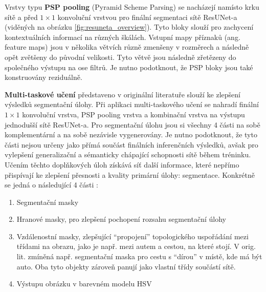 Vrstvy typu \textbf{PSP pooling} (Pyramid Scheme Parsing) se nacházejí namísto krku sítě a před $1\times1$ konvoluční vrstvou pro finální segmentaci sítě ResUNet-a (viděných na obrázku \ref{fig:resuneta_overview}). Tyto bloky slouží pro zachycení kontextuálních informací na různých škálách. Vstupní mapy příznaků (ang. feature maps) jsou v několika větvích různě zmenšeny v rozměrech a následně opět zvětšeny do původní velikosti. Tyto větvě jsou následně zřetězeny do společného výstupu na ose filtrů. Je nutno podotknout, že PSP bloky jsou také konstruovány reziduálně.

\textbf{Multi-taskové učení} představeno v originální literatuře slouží ke zlepšení výsledků segmentační úlohy. Při aplikaci multi-taskového učení se nahradí finální $1\times1$ konvoluční vrstva, PSP pooling vrstva a kombinační vrstva na výstupu jednodušší sítě ResUNet-a. Pro segmentační úlohu jsou si všechny 4 části na sobě komplementární a na sobě nezávisle vygenerovány. Je nutno podotknout, že tyto části nejsou určeny jako přímá součást finálních inferenčních výsledků, avšak pro vylepšení generalizační a sémanticky chápající schopnosti sítě během tréninku. Učením těchto doplňkových úloh získává síť další informace, které nepřímo přispívají ke zlepšení přesnosti a kvality primární úlohy: segmentace. Konkrétně se jedná o následující 4 části \cite{resuneta}: 
\begin{enumerate}
    \item Segmentační masky
    \item Hranové masky, pro zlepšení pochopení rozsahu segmentační úlohy
    \item Vzdálenostní masky, zlepšující \enquote{propojení} topologického uspořádání mezi třídami na obrazu, jako je např. mezi autem a cestou, na které stojí. V orig. lit. zmíněná např. segmentační maska pro cestu s \enquote{dírou} v místě, kde má být auto. Oba tyto objekty zároveň panují jako vlastní třídy součástí sítě.
    \item Výstupu obrázku v barevném modelu HSV
\end{enumerate}
\endinput